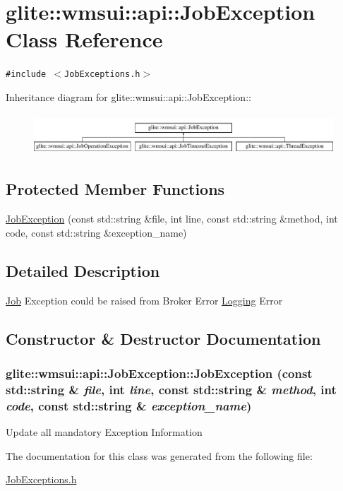 \hypertarget{classglite_1_1wmsui_1_1api_1_1JobException}{
\section{glite::wmsui::api::Job\-Exception Class Reference}
\label{classglite_1_1wmsui_1_1api_1_1JobException}
}
{\tt \#include $<$Job\-Exceptions.h$>$}

Inheritance diagram for glite::wmsui::api::Job\-Exception::\begin{figure}[H]
\begin{center}
\leavevmode
\includegraphics[height=1.53005cm]{classglite_1_1wmsui_1_1api_1_1JobException}
\end{center}
\end{figure}
\subsection*{Protected Member Functions}
\begin{CompactItemize}
\item 
\hyperlink{classglite_1_1wmsui_1_1api_1_1JobException_b0}{Job\-Exception} (const std::string \&file, int line, const std::string \&method, int code, const std::string \&exception\_\-name)
\end{CompactItemize}


\subsection{Detailed Description}
\hyperlink{classglite_1_1wmsui_1_1api_1_1Job}{Job} Exception could be raised from Broker Error \hyperlink{classglite_1_1wmsui_1_1api_1_1Logging}{Logging} Error 



\subsection{Constructor \& Destructor Documentation}
\hypertarget{classglite_1_1wmsui_1_1api_1_1JobException_b0}{
\subsubsection[JobException]{\setlength{\rightskip}{0pt plus 5cm}glite::wmsui::api::Job\-Exception::Job\-Exception (const std::string \& {\em file}, int {\em line}, const std::string \& {\em method}, int {\em code}, const std::string \& {\em exception\_\-name})}}
\label{classglite_1_1wmsui_1_1api_1_1JobException_b0}


Update all mandatory Exception Information 

The documentation for this class was generated from the following file:\begin{CompactItemize}
\item 
\hyperlink{JobExceptions_8h}{Job\-Exceptions.h}\end{CompactItemize}
